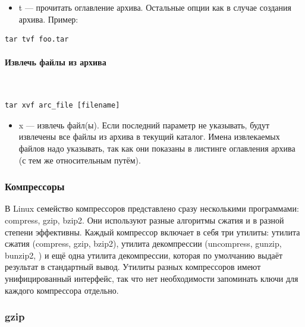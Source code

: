 \documentclass[14pt, a4paper]{article}
\begin{document}
\begin{itemize}
    \item t — прочитать оглавление архива. Остальные опции как в случае создания архива. Пример:
\end{itemize}

\begin{lstlisting}
tar tvf foo.tar
\end{lstlisting}

\paragraph*{Извлечь файлы из архива} \mbox{}\\

\begin{lstlisting}
tar xvf arc_file [filename]
\end{lstlisting}

\begin{itemize}
    \item x — извлечь файл(ы). Если последний параметр не указывать, будут извлечены все файлы из
    архива в текущий каталог. Имена извлекаемых файлов надо указывать, так как они показаны в
    листинге оглавления архива (с тем же относительным путём).
\end{itemize}



\subsubsection*{Компрессоры}

В Linux семейство компрессоров представлено сразу несколькими программами: compress,
gzip, bzip2. Они используют разные алгоритмы сжатия и в разной степени эффективны. Каждый
компрессор включает в себя три утилиты: утилита сжатия (compress, gzip, bzip2), утилита
декомпрессии (uncompress, gunzip, bunzip2, ) и ещё одна утилита декомпрессии, которая по
умолчанию выдаёт результат в стандартный вывод. Утилиты разных компрессоров имеют
унифицированный интерфейс, так что нет необходимости запоминать ключи для каждого
компрессора отдельно.



\subsubsection*{gzip}
\end{document}
